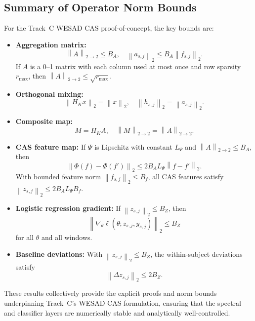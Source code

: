 \documentclass[11pt]{article}
\newcommand{\norm}[1]{\left\lVert #1 \right\rVert}
\begin{document}
\subsection{Summary of Operator Norm Bounds}

For the Track~C WESAD CAS proof-of-concept, the key bounds are:

\begin{itemize}
  \item \textbf{Aggregation matrix:}
    \[
      \norm{A}_{2\to2} \le B_A, \quad
      \norm{a_{s,j}}_2 \le B_A \norm{f_{s,j}}_2.
    \]
    If \(A\) is a 0--1 matrix with each column used at most once and row sparsity \(r_{\max}\), then \(\norm{A}_{2\to2} \le \sqrt{r_{\max}}\).
  \item \textbf{Orthogonal mixing:}
    \[
      \norm{H_K x}_2 = \norm{x}_2, \quad
      \norm{h_{s,j}}_2 = \norm{a_{s,j}}_2.
    \]
  \item \textbf{Composite map:}
    \[
      M = H_K A, \quad
      \norm{M}_{2\to2} = \norm{A}_{2\to2}.
    \]
  \item \textbf{CAS feature map:}
    If \(\Psi\) is Lipschitz with constant \(L_\Psi\) and \(\norm{A}_{2\to2} \le B_A\), then
    \[
      \norm{\Phi(f) - \Phi(f')}_2 \le 2 B_A L_\Psi \norm{f-f'}_2.
    \]
    With bounded feature norm \(\norm{f_{s,j}}_2 \le B_f\), all CAS features satisfy \(\norm{z_{s,j}}_2 \le 2 B_A L_\Psi B_f\).
  \item \textbf{Logistic regression gradient:}
    If \(\norm{z_{s,j}}_2 \le B_Z\), then
    \[
      \norm{\nabla_\theta \ell(\theta; z_{s,j}, y_{s,j})}_2 \le B_Z
    \]
    for all \(\theta\) and all windows.
  \item \textbf{Baseline deviations:}
    With \(\norm{z_{s,j}}_2 \le B_Z\), the within-subject deviations satisfy
    \[
      \norm{\Delta z_{s,j}}_2 \le 2 B_Z.
    \]
\end{itemize}

These results collectively provide the explicit proofs and norm bounds underpinning Track~C’s WESAD CAS formulation, ensuring that the spectral and classifier layers are numerically stable and analytically well-controlled.



\nocite{*}
  
  
\end{document}
